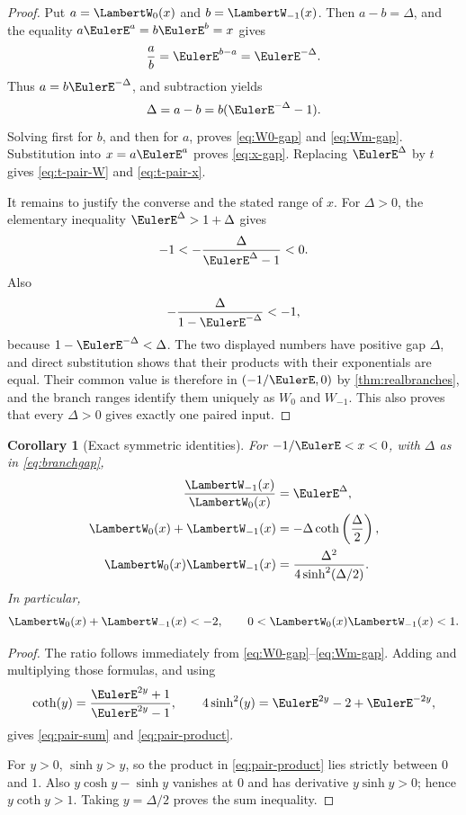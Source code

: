 \documentclass[11pt]{article}
\newtheorem{corollary}[corollary]{Corollary}
\theoremstyle{remark}
\newcommand{\Wz}{\LambertW_{0}}
\newcommand{\Wm}{\LambertW_{-1}}
\begin{document}
\begin{proof}
Put \(a=\Wz(x)\) and \(b=\Wm(x)\).  Then
\(a-b=\Delta\), and the equality \(a\EulerE^a=b\EulerE^b=x\) gives
\[
       \frac{a}{b}=\EulerE^{b-a}=\EulerE^{-\Delta}.
\]
Thus \(a=b\EulerE^{-\Delta}\), and subtraction yields
\[
 \Delta=a-b=b(\EulerE^{-\Delta}-1).
\]
Solving first for \(b\), and then for \(a\), proves
\eqref{eq:W0-gap} and \eqref{eq:Wm-gap}.  Substitution into
\(x=a\EulerE^a\) proves \eqref{eq:x-gap}.  Replacing
\(\EulerE^\Delta\) by \(t\) gives \eqref{eq:t-pair-W} and
\eqref{eq:t-pair-x}.

It remains to justify the converse and the stated range of \(x\).  For
\(\Delta>0\), the elementary inequality \(\EulerE^\Delta>1+\Delta\)
gives
\[
       -1<-\frac{\Delta}{\EulerE^\Delta-1}<0.
\]
Also
\[
 -\frac{\Delta}{1-\EulerE^{-\Delta}}<-1,
\]
because \(1-\EulerE^{-\Delta}<\Delta\).  The two displayed numbers have
positive gap \(\Delta\), and direct substitution shows that their products
with their exponentials are equal.  Their common value is therefore in
\((-1/\EulerE,0)\) by \cref{thm:realbranches}, and the branch ranges identify
them uniquely as \(W_0\) and \(W_{-1}\).  This also proves that every
\(\Delta>0\) gives exactly one paired input.
\end{proof}

\begin{corollary}[Exact symmetric identities]\label{cor:pair-symmetric}
For \(-1/\EulerE<x<0\), with \(\Delta\) as in
\eqref{eq:branchgap},
\begin{align}
 \frac{\Wm(x)}{\Wz(x)}&=\EulerE^\Delta,
 \label{eq:pair-ratio}\\
 \Wz(x)+\Wm(x)&=-\Delta\coth\left(\frac\Delta2\right),
 \label{eq:pair-sum}\\
 \Wz(x)\Wm(x)&=
 \frac{\Delta^2}{4\sinh^2(\Delta/2)}.
 \label{eq:pair-product}
\end{align}
In particular,
\begin{equation}\label{eq:pair-inequalities}
       \Wz(x)+\Wm(x)<-2,
       \qquad 0<\Wz(x)\Wm(x)<1.
\end{equation}
\end{corollary}

\begin{proof}
The ratio follows immediately from
\eqref{eq:W0-gap}--\eqref{eq:Wm-gap}.  Adding and multiplying those
formulas, and using
\[
 \coth(y)=\frac{\EulerE^{2y}+1}{\EulerE^{2y}-1},
 \qquad
 4\sinh^2(y)=\EulerE^{2y}-2+\EulerE^{-2y},
\]
gives \eqref{eq:pair-sum} and \eqref{eq:pair-product}.

For \(y>0\), \(\sinh y>y\), so the product in
\eqref{eq:pair-product} lies strictly between \(0\) and \(1\).  Also
\(y\cosh y-\sinh y\) vanishes at \(0\) and has derivative
\(y\sinh y>0\); hence \(y\coth y>1\).  Taking \(y=\Delta/2\)
proves the sum inequality.
\end{proof}
\end{document}
